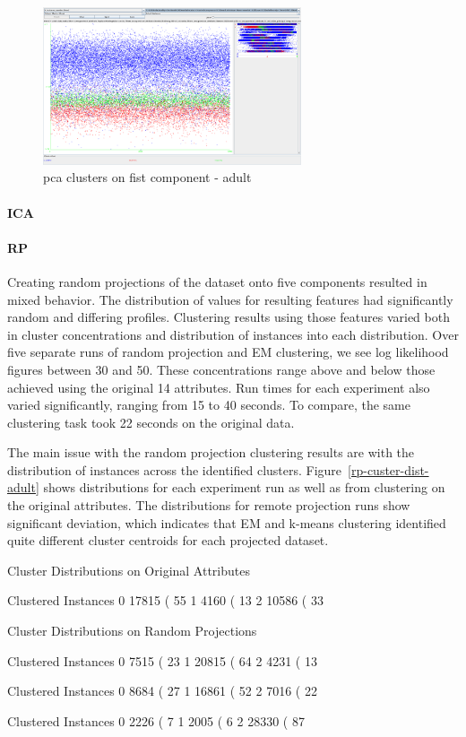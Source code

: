 \documentclass{sig-alternate}
\begin{document}
\begin{figure}[!htbp]
    \centering
    \includegraphics[width=3in]{part2/adult/pca-cluster-scatter.pdf}
    \caption{pca clusters on fist component - adult\label{pca-cluster-scatter}}
\end{figure} 


\paragraph{ICA}

\paragraph{RP}

Creating random projections of the dataset onto five components resulted in mixed behavior. The distribution of values for resulting features had significantly random and differing profiles. Clustering results using those features varied both in cluster concentrations and distribution of instances into each distribution. Over five separate runs of random projection and EM clustering, we see log likelihood figures between 30 and 50. These concentrations range above and below those achieved using the original 14 attributes. Run times for each experiment also varied significantly, ranging from 15 to 40 seconds. To compare, the same clustering task took 22 seconds on the original data.

The main issue with the random projection clustering results are with the distribution of instances across the identified clusters. Figure~\ref{rp-custer-dist-adult} shows distributions for each experiment run as well as from clustering on the original attributes. The distributions for remote projection runs show significant deviation, which indicates that EM and k-means clustering identified quite different cluster centroids for each projected dataset.

\begin{verbbox}
Cluster Distributions on Original Attributes

Clustered Instances
0      17815 ( 55%
1       4160 ( 13%
2      10586 ( 33%


Cluster Distributions on Random Projections

Clustered Instances
0       7515 ( 23%
1      20815 ( 64%
2       4231 ( 13%

Clustered Instances
0       8684 ( 27%
1      16861 ( 52%
2       7016 ( 22%

Clustered Instances
0       2226 (  7%
1       2005 (  6%
2      28330 ( 87%
\end{verbbox}
\end{document}
